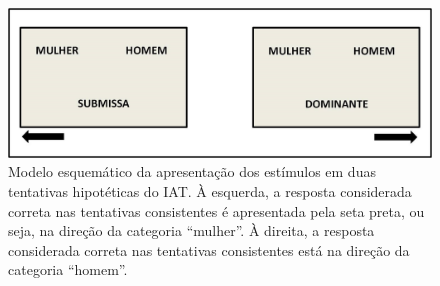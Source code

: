 \begin{figure}[h]
    \includegraphics[width=\linewidth]{5/figura1.jpg}
    \caption{Modelo esquemático da apresentação dos estímulos em duas tentativas hipotéticas do IAT. À esquerda, a resposta considerada correta nas tentativas consistentes é apresentada pela seta preta, ou seja, na direção da categoria ``mulher''. À direita, a resposta considerada correta nas tentativas consistentes está na direção da categoria ``homem''.}
    \label{fig1}
\end{figure}

